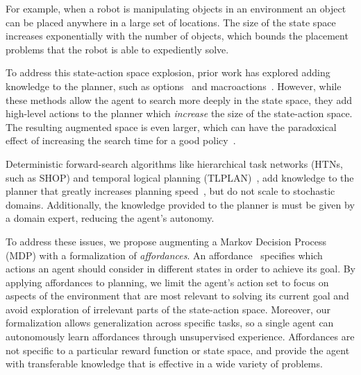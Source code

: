 \documentclass[conference]{IEEEtran}
\begin{document}
For example, when a robot is manipulating objects in an environment
an object can be placed anywhere in a large set of locations. The size
of the state space increases exponentially with the number of objects,
which bounds the placement problems that the robot is able to expediently solve.

To address this state-action space explosion, prior work has explored adding knowledge to the planner,
such as options~\cite{sutton99} and macroactions~\cite{Botea:2005kx,Newton:2005vn}. 
However, while these methods allow the agent to search more deeply in the state
space, they add high-level actions to the planner which {\em increase} the size of the state-action space.
The resulting augmented space is even larger, which can have
the paradoxical effect of increasing the search time for a good
policy~\cite{Jong:2008zr}.

Deterministic forward-search algorithms like hierarchical task networks (HTNs, such as SHOP) and
temporal logical planning (TLPLAN)~\citep{Bacchus95usingtemporal,Bacchus99usingtemporal}, add
knowledge to the planner that greatly increases planning speed~\citep{Nau:1999:SSH:1624312.1624357}, but do not
scale to stochastic domains. Additionally, the knowledge provided to the planner is must be given by a domain expert,
reducing the agent's autonomy.


To address these issues, we propose augmenting a Markov Decision
Process (MDP) with a formalization of {\em affordances}. An
affordance~\cite{gibson77} specifies which actions an agent should consider in
different states in order to achieve its goal. By applying affordances to planning,
we limit the agent's action set to focus on aspects of the environment that
are most relevant to solving its current goal and avoid
exploration of irrelevant parts of the state-action space.
Moreover, our formalization allows generalization across
specific tasks, so a single agent can autonomously learn affordances
through unsupervised experience. Affordances are not specific to a particular reward
function or state space, and provide the agent with transferable
knowledge that is effective in a wide variety of problems.

\end{document}
